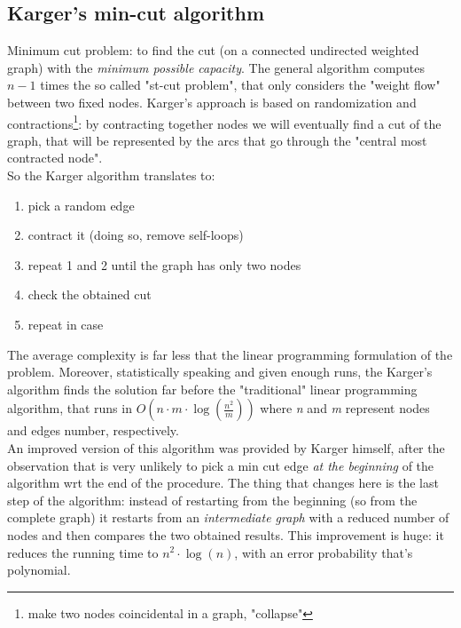 \documentclass{article}
\begin{document}
		\subsection{Karger's min-cut algorithm}
			Minimum cut problem: to find the cut (on a connected undirected weighted graph) with the \textit{minimum possible capacity}. The general algorithm computes $n - 1$ times the so called "st-cut problem", that only considers the "weight flow" between two fixed nodes. Karger's approach is based on randomization and contractions\footnote{make two nodes coincidental in a graph, "collapse"}: by contracting together nodes we will eventually find a cut of the graph, that will be represented by the arcs that go through the "central most contracted node".\\
			So the Karger algorithm translates to:
			\begin{enumerate}
				\item pick a random edge
				\item contract it (doing so, remove self-loops)
				\item repeat 1 and 2 until the graph has only two nodes
				\item check the obtained cut
				\item repeat in case
			\end{enumerate}
			The average complexity is far less that the linear programming formulation of the problem. Moreover, statistically speaking and given enough runs, the Karger's algorithm finds the solution far before the "traditional" linear programming algorithm, that runs in $O(n \cdot m \cdot \log (\frac{n^2}{m}))$ where \emph{n} and \emph{m} represent nodes and edges number, respectively.\\
			An improved version of this algorithm was provided by Karger himself, after the observation that is very unlikely to pick a min cut edge \textit{at the beginning} of the algorithm wrt the end of the procedure. The thing that changes here is the last step of the algorithm: instead of restarting from the beginning (so from the complete graph) it restarts from an \textit{intermediate graph} with a reduced number of nodes and then compares the two obtained results. This improvement is huge: it reduces the running time to $n^2 \cdot \log(n)$, with an error probability that's polynomial.
\end{document}
